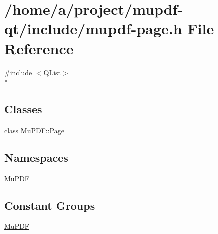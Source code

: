 \hypertarget{mupdf-page_8h}{\section{/home/a/project/mupdf-\/qt/include/mupdf-\/page.h File Reference}
\label{mupdf-page_8h}
}
{\ttfamily \#include $<$Q\-List$>$}\\*
\subsection*{Classes}
\begin{DoxyCompactItemize}
\item 
class \hyperlink{class_mu_p_d_f_1_1_page}{Mu\-P\-D\-F\-::\-Page}
\end{DoxyCompactItemize}
\subsection*{Namespaces}
\begin{DoxyCompactItemize}
\item 
\hyperlink{namespace_mu_p_d_f}{Mu\-P\-D\-F}
\end{DoxyCompactItemize}
\subsection*{Constant Groups}
\begin{DoxyCompactItemize}
\item 
\hyperlink{namespace_mu_p_d_f}{Mu\-P\-D\-F}
\end{DoxyCompactItemize}
